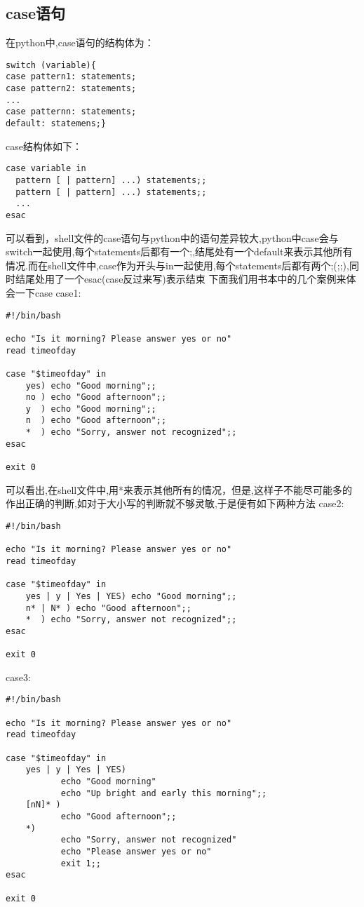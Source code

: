 \documentclass{ctexart}
\begin{document}
\subsection{case语句}
在python中,case语句的结构体为：
\begin{verbatim}
switch (variable){
case pattern1: statements;
case pattern2: statements;
...
case patternn: statements;
default: statemens;}
\end{verbatim}
case结构体如下：
\begin{verbatim}
case variable in
  pattern [ | pattern] ...) statements;;
  pattern [ | pattern] ...) statements;;
  ...
esac
\end{verbatim}
可以看到，shell文件的case语句与python中的语句差异较大,python中case会与switch一起使用,每个statements后都有一个;,结尾处有一个default来表示其他所有情况.而在shell文件中,case作为开头与in一起使用,每个statements后都有两个;(;;),同时结尾处用了一个esac(case反过来写)表示结束
下面我们用书本中的几个案例来体会一下case
case1:
\begin{verbatim}
#!/bin/bash

echo "Is it morning? Please answer yes or no"
read timeofday

case "$timeofday" in
    yes) echo "Good morning";;
    no ) echo "Good afternoon";;
    y  ) echo "Good morning";;
    n  ) echo "Good afternoon";;
    *  ) echo "Sorry, answer not recognized";;
esac

exit 0
\end{verbatim}
可以看出,在shell文件中,用*来表示其他所有的情况，但是,这样子不能尽可能多的作出正确的判断,如对于大小写的判断就不够灵敏,于是便有如下两种方法
case2:
\begin{verbatim}
#!/bin/bash

echo "Is it morning? Please answer yes or no"
read timeofday

case "$timeofday" in
    yes | y | Yes | YES) echo "Good morning";;
    n* | N* ) echo "Good afternoon";;
    *  ) echo "Sorry, answer not recognized";;
esac

exit 0
\end{verbatim}
case3:
\begin{verbatim}
#!/bin/bash

echo "Is it morning? Please answer yes or no"
read timeofday

case "$timeofday" in
    yes | y | Yes | YES) 
           echo "Good morning"
           echo "Up bright and early this morning";;
    [nN]* ) 
           echo "Good afternoon";;
    *) 
           echo "Sorry, answer not recognized"
           echo "Please answer yes or no"
           exit 1;;
esac

exit 0
\end{verbatim}
\end{document}
